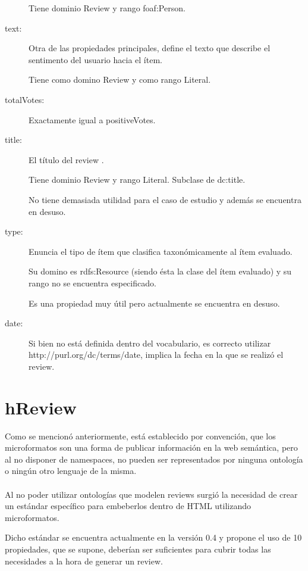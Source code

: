 \begin{description}
  Tiene dominio Review y rango foaf:Person. 
  \item [text:] Otra de las propiedades principales, define el texto que describe el sentimento del usuario hacia el ítem. 
  
  Tiene como domino Review y como rango Literal.
  \item [totalVotes:] Exactamente igual a positiveVotes.
  \item [title:] El título del review . 
  
  Tiene dominio Review y rango Literal. Subclase de dc:title. 
  
  No tiene demasiada utilidad para el caso de estudio y además se encuentra en desuso.
  \item [type:] Enuncia el tipo de ítem que clasifica taxonómicamente al ítem evaluado. 
  
  Su domino es rdfs:Resource (siendo ésta la clase del ítem evaluado) y su rango no se encuentra especificado. 
  
  Es una propiedad muy útil pero actualmente se encuentra en desuso.
  \item [date:] Si bien no está definida dentro del vocabulario, es correcto utilizar http://purl.org/dc/terms/date, implica la fecha
  en la que se realizó el review.
\end{description}

\section{hReview}
\label{section:hreview}

Como se mencionó anteriormente, está establecido por convención, que los microformatos son una forma de publicar información en la 
web semántica, pero al no disponer de namespaces, no pueden ser representados por ninguna ontología o ningún otro lenguaje de la misma. 
\\\\
Al no poder utilizar ontologías que modelen reviews surgió la necesidad de crear un estándar específico para embeberlos dentro de HTML 
utilizando microformatos.

Dicho estándar se encuentra actualmente en la versión 0.4 y propone el uso de 10 propiedades, que se supone, deberían ser 
suficientes para cubrir todas las necesidades a la hora de generar un review.

